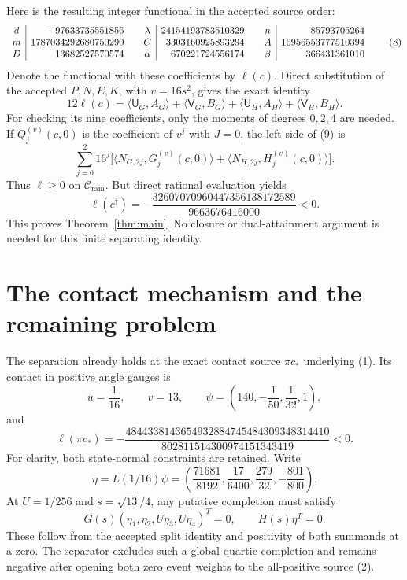 \documentclass[10pt]{article}
\newcommand{\Cr}{\mathcal C_{\mathrm{ram}}}
\newcommand{\ip}[2]{\langle #1,#2\rangle}
\begin{document}
Here is the resulting integer functional in the accepted source order:
\[
\begin{array}{c|r@{\qquad}c|r@{\qquad}c|r}
 d&-97633735551856&\lambda&24154193783510329&n&85793705264\\
 m&1787034292680750290&C&3303160925893294&A&16956553777510394\\
 D&13682527570574&\alpha&670221724556174&\beta&366431361010
\end{array}
                                                               \tag{8}
\]
Denote the functional with these coefficients by $\ell(c)$.
Direct substitution of the accepted $P,N,E,K$, with $v=16s^2$, gives
the exact identity
\[
 \boxed{12\ell(c)=
 \ip{\mathsf U_G}{A_G}+\ip{\mathsf V_G}{B_G}
 +\ip{\mathsf U_H}{A_H}+\ip{\mathsf V_H}{B_H}.}             \tag{9}
\]
For checking its nine coefficients, only the moments of degrees $0,2,4$
are needed. If $Q_j^{(v)}(c,0)$ is the coefficient of $v^j$ with $J=0$,
the left side of (9) is
\[
 \sum_{j=0}^2 16^j\bigl[
 \ip{N_{G,2j}}{G_j^{(v)}(c,0)}+
 \ip{N_{H,2j}}{H_j^{(v)}(c,0)}\bigr].                     \tag{10}
\]
Thus $\ell\ge0$ on $\Cr$. But direct rational evaluation yields
\[
 \boxed{\ell(c^\dagger)=
 -\frac{32607070960447356138172589}{9663676416000}<0.}      \tag{11}
\]
This proves Theorem~\ref{thm:main}. No closure or dual-attainment argument
is needed for this finite separating identity.

\section{The contact mechanism and the remaining problem}

The separation already holds at the exact contact source $\pi c_*$
underlying (1). Its contact in positive angle gauges is
\[
 u=\frac1{16},\qquad v=13,\qquad
 \psi=\left(140,-\frac1{50},\frac1{32},1\right),
\]
and
\[
 \ell(\pi c_*)=
 -\frac{4844338143654932884745484309348314410}
        {802811514300974151343419}<0.                    \tag{12}
\]
For clarity, both state-normal constraints are retained. Write
\[
 \eta=L(1/16)\psi=
 \left(\frac{71681}{8192},\frac{17}{6400},
       \frac{279}{32},-\frac{801}{800}\right).
\]
At $U=1/256$ and $s=\sqrt{13}/4$, any putative completion must satisfy
\[
 G(s)(\eta_1,\eta_2,U\eta_3,U\eta_4)^T=0,\qquad
 H(s)\eta^T=0.                                          \tag{13}
\]
These follow from the accepted split identity and positivity of both
summands at a zero. The separator excludes such a global quartic
completion and remains negative after opening both zero event weights to
the all-positive source (2).
\end{document}
